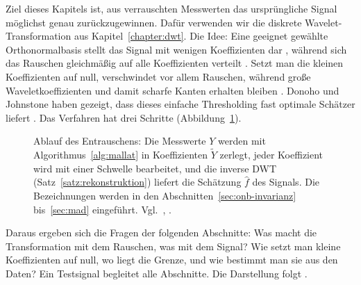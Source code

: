 \documentclass[a4paper,11pt,bibliography=totoc,listof=totoc,headinclude=true,cleardoublepage=empty,oneside]{scrbook}
\theoremstyle{plain}
\theoremstyle{definition}
\begin{document}
Ziel dieses Kapitels ist, aus verrauschten Messwerten das ursprüngliche Signal
möglichst genau zurückzugewinnen. Dafür verwenden wir die diskrete
Wavelet-Transformation aus Kapitel~\ref{chapter:dwt}. Die Idee: Eine geeignet
gewählte Orthonormalbasis stellt das Signal mit wenigen Koeffizienten dar
\cite[Kap.~11.3]{mallat}, %
während sich das Rauschen gleichmä\ss ig auf alle Koeffizienten verteilt
\cite[Kap.~11.2.1]{mallat}. %
Setzt man die kleinen Koeffizienten auf null, verschwindet vor allem Rauschen,
während gro\ss e Waveletkoeffizienten und damit scharfe Kanten erhalten bleiben
\cite[Kap.~11.3.1]{mallat}. %
Donoho und Johnstone haben gezeigt, dass dieses einfache Thresholding fast
optimale Schätzer liefert \cite[Kap.~11.2]{mallat}. %
Das Verfahren hat drei Schritte (Abbildung~\ref{fig:dreischritt}).
 
\begin{figure}[htbp]
  \centering
  \caption[Ablauf des Entrauschens]{Ablauf des Entrauschens: Die Messwerte $Y$
  werden mit Algorithmus~\ref{alg:mallat} in Koeffizienten $\tilde Y$
  zerlegt, jeder Koeffizient wird mit einer Schwelle bearbeitet, und die inverse
  DWT (Satz~\ref{satz:rekonstruktion}) liefert die Schätzung $\hat f$ des
  Signals. Die Bezeichnungen werden in den Abschnitten~\ref{sec:onb-invarianz}
  bis~\ref{sec:mad} eingeführt. Vgl.\ \cite[Gl.~(11.84)]{mallat},
  \cite[Abb.~2.10]{rebstadt}.} %
  \label{fig:dreischritt}
\end{figure}
 
Daraus ergeben sich die Fragen der folgenden Abschnitte: Was macht die
Transformation mit dem Rauschen, was mit dem Signal? Wie setzt man kleine
Koeffizienten auf null, wo liegt die Grenze, und wie bestimmt man sie aus den
Daten? Ein Testsignal begleitet alle Abschnitte. Die Darstellung folgt
\cite[Kap.~11.2--11.3.1]{mallat}. %
 
\end{document}
